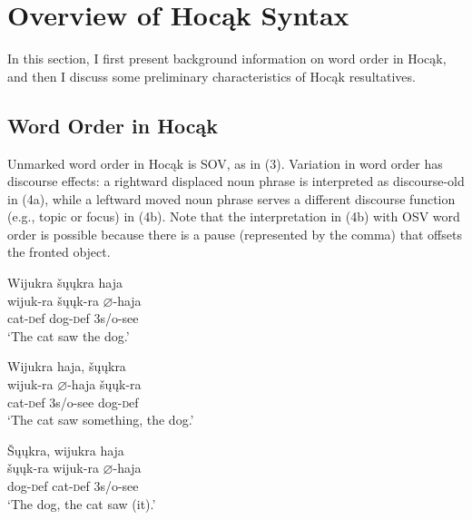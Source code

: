 \documentclass[output=paper]{LSP/langsci}
\begin{document}
\section{Overview of Hoc\k{a}k Syntax}

In this section, I first present background information on word order in Hoc\k{a}k, and then I discuss some preliminary characteristics of Hoc\k{a}k resultatives.

\subsection{Word Order in Hoc\k{a}k}

Unmarked word order in Hoc\k{a}k is SOV, as in (3). Variation in word order has discourse effects: a rightward displaced noun phrase is interpreted as discourse-old in (4a), while a leftward moved noun phrase serves a different discourse function (e.g., topic or focus) in (4b). Note that the interpretation in (4b) with OSV word order is possible because there is a pause (represented by the comma) that offsets the fronted object.

\begin{exe}

\ex \glll Wijukra \v{s}\k{u}\k{u}kra haja \\
 wijuk-ra \v{s}\k{u}\k{u}k-ra $\varnothing$-haja\\
cat-{\textsc def} dog-{\textsc def} {\textsc 3s/o}-see\\
\glt `The cat saw the dog.'

\end{exe}

\begin{exe}
\ex
\begin{xlist}

\ex \glll Wijukra  haja, \v{s}\k{u}\k{u}kra \\
 wijuk-ra $\varnothing$-haja  \v{s}\k{u}\k{u}k-ra\\
cat-{\textsc def}  {\textsc 3s/o}-see dog-{\textsc def}\\
\glt `The cat saw something, the dog.' 

\ex \glll \v{S}\k{u}\k{u}kra, wijukra haja  \\
 \v{s}\k{u}\k{u}k-ra wijuk-ra $\varnothing$-haja  \\
dog-{\textsc def} cat-{\textsc def}  {\textsc 3s/o}-see \\
\glt `The dog, the cat saw (it).' 

\end{xlist}
\end{exe}
\end{document}

